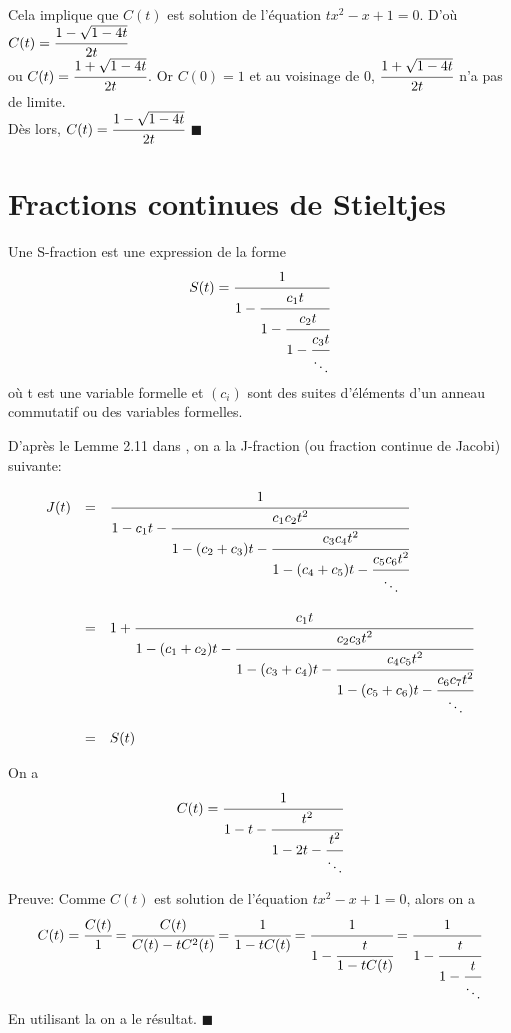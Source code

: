 Cela implique que $C(t)$ est solution de l'équation $tx^2-x+1 = 0$. D'où $C(t)=\cfrac{1-\sqrt{1-4t}}{2t}$\\ ou $C(t)=\cfrac{1+\sqrt{1-4t}}{2t}$. Or $C(0)=1
$ et au voisinage de 0, $\cfrac{1+\sqrt{1-4t}}{2t}$ n'a pas de limite.\\
Dès lors, $C(t)=\cfrac{1-\sqrt{1-4t}}{2t}$ \hspace{5pt}$\blacksquare$

\section{Fractions continues de Stieltjes}
\begin{definition}
	\begin{rm}
		Une S-fraction est une expression de la forme
		\[
			S(t)=\cfrac{1}{1-\cfrac{c_{1}t}{1-\cfrac{c_{2}t}{1-\cfrac{c_{3}t}{\ddots}}}}
		\]
		où t est une variable formelle et $(c_{i})$ sont des suites d'éléments d'un anneau commutatif ou des variables formelles.
	\end{rm}
\end{definition}
D'après le Lemme 2.11 dans \cite{ref30}, on a la J-fraction (ou fraction continue de Jacobi) suivante:
\begin{proposition}\label{j-frac}
	\begin{rm}
		\[
			\begin{array}{l l l}

				J(t) & =       & \cfrac{1}{1-c_{1}t-\cfrac{c_{1}c_{2}t^2}{1-(c_{2}+c_{3})t-\cfrac{c_{3}c_{4}t^2}{1-(c_{4}+c_{5})t-\cfrac{c_{5}c_{6}t^2}{\ddots}}}}                \\
				     & \text{} &                                                                                                                                                  \\

				     & =       & 1+\cfrac{c_{1}t}{1-(c_{1}+c_{2})t-\cfrac{c_{2}c_{3}t^2}{1-(c_{3}+c_{4})t-\cfrac{c_{4}c_{5}t^2}{1-(c_{5}+c_{6})t-\cfrac{c_{6}c_{7}t^2}{\ddots}}}} \\
				     & \text{} &                                                                                                                                                  \\
				     & =       & S(t)
			\end{array}
		\]
	\end{rm}
\end{proposition}

\begin{proposition}\label{cat-frac}
	On a
	\[C(t) = \cfrac{1}{1-t-\cfrac{t^2}{1-2t-\cfrac{t^2}{\ddots}}} \]
\end{proposition}
Preuve:
Comme $C(t)$ est solution de l'équation $tx^{2} - x +1 =0$, alors on a
\[
	C(t) = \cfrac{C(t)}{1}=\cfrac{C(t)}{C(t)-tC^2(t)}=\cfrac{1}{1-tC(t)}= \cfrac{1}{1-\cfrac{t}{1-tC(t)}} = \cfrac{1}{1-\cfrac{t}{1-\cfrac{t}{\ddots}}}
\]
En utilisant la  on a le résultat. \hspace{10pt} $\blacksquare$

